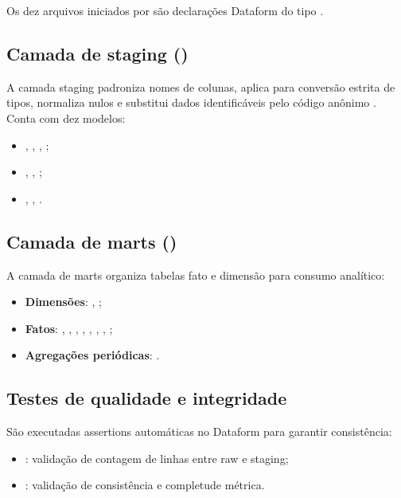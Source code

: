 \documentclass[11pt,a4paper]{article}
\begin{document}
Os dez arquivos iniciados por  são declarações Dataform do tipo
.

\subsection{Camada de staging ()}

A camada staging padroniza nomes de colunas, aplica  para
conversão estrita de tipos, normaliza nulos e substitui dados identificáveis
pelo código anônimo . Conta com dez modelos:

\begin{itemize}
  \item {}, , , ;
  \item {}, , ;
  \item {}, , .
\end{itemize}

\subsection{Camada de marts ()}

A camada de marts organiza tabelas fato e dimensão para consumo analítico:

\begin{itemize}
  \item \textbf{Dimensões}: , ;
  \item \textbf{Fatos}: , , , , , , , ;
  \item \textbf{Agregações periódicas}: .
\end{itemize}

\subsection{Testes de qualidade e integridade}

São executadas assertions automáticas no Dataform para garantir consistência:
\begin{itemize}
  \item {}: validação de contagem de linhas entre raw e staging;
  \item {}: validação de consistência e completude métrica.
\end{itemize}
\end{document}
